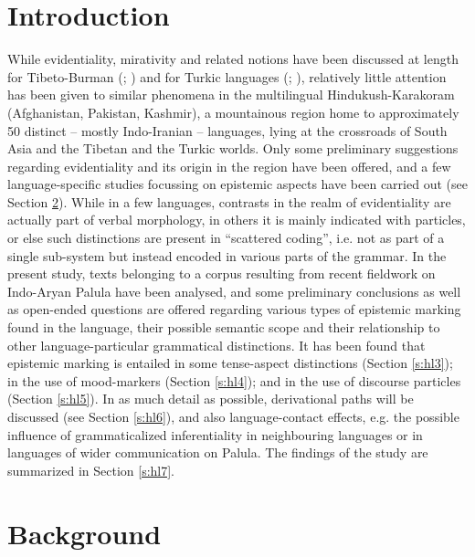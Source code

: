\documentclass[output=paper]{langsci/langscibook}
\author{Henrik Liljegren \affiliation{University of Stockholm}}
\begin{document}
\maketitle

\section{Introduction} 

While evidentiality, mirativity and related notions have been discussed at length for Tibeto-Burman (\citealt{DeLancey1986}; \citeyear{DeLancey2001}) and for Turkic languages (\citealt{Johanson2000}; \citeyear{Johanson2003}), relatively little attention has been given to similar phenomena in the multilingual Hindukush-Karakoram (Afghanistan, Pakistan, Kashmir), a mountainous region home to approximately 50 distinct – mostly Indo-Iranian – languages, lying at the crossroads of South Asia and the Tibetan and the Turkic worlds. Only some preliminary suggestions regarding evidentiality and its origin in the region have been offered, and a few language-specific studies focussing on epistemic aspects have been carried out (see Section \ref{s:hl2}). While in a few languages, contrasts in the realm of evidentiality are actually part of verbal morphology, in others it is mainly indicated with particles, or else such distinctions are present in “scattered coding”, i.e. not as part of a single sub-system but instead encoded in various parts of the grammar. In the present study, texts belonging to a corpus resulting from recent fieldwork on Indo-Aryan Palula have been analysed, and some preliminary conclusions as well as open-ended questions are offered regarding various types of epistemic marking found in the language, their possible semantic scope and their relationship to other language-particular grammatical distinctions. It has been found that epistemic marking is entailed in some tense-aspect distinctions (Section \ref{s:hl3}); in the use of mood-markers (Section \ref{s:hl4}); and in the use of discourse particles (Section \ref{s:hl5}). In as much detail as possible, derivational paths will be discussed (see Section \ref{s:hl6}), and also language-contact effects, e.g. the possible influence of grammaticalized inferentiality in neighbouring languages or in languages of wider communication on Palula. The findings of the study are summarized in Section \ref{s:hl7}.

\section{Background}\label{s:hl2}
\end{document}
